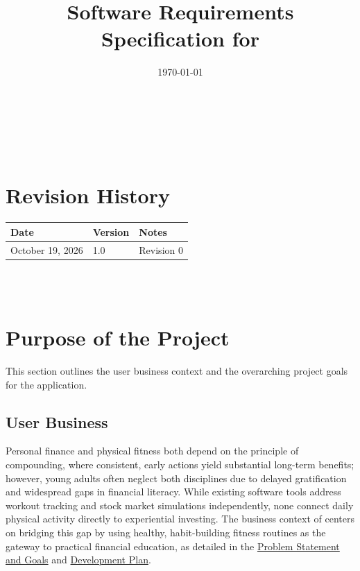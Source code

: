 \documentclass[12pt]{article}
\begin{document}
\title{Software Requirements Specification for \progname} 
\author{\authname}
\date{\today}
	
\maketitle

~\newpage


\tableofcontents

~\newpage

\section*{Revision History}

\begin{tabularx}{\textwidth}{p{3cm}p{2cm}X}
\toprule {\textbf{Date}} & {\textbf{Version}} & {\textbf{Notes}}\\
\midrule
October 19, 2026 & 1.0 & Revision 0\\
\bottomrule
\end{tabularx}

~\\

~\newpage
\section{Purpose of the Project}
This section outlines the user business context and the overarching project
goals for the \progname{} application.

\subsection{User Business}
Personal finance and physical fitness both depend on the principle of
compounding, where consistent, early actions yield substantial long-term
benefits; however, young adults often neglect both disciplines due to delayed
gratification and widespread gaps in financial literacy. While existing software
tools address workout tracking and stock market simulations independently, none
connect daily physical activity directly to experiential investing. The business
context of \progname{} centers on bridging this gap by using healthy,
habit-building fitness routines as the gateway to practical financial education,
as detailed in the
\href{https://github.com/arjunkarthik123/fitness-finance-application/blob/main/pdfs/ProblemStatementAndGoals/ProblemStatement.pdf}{Problem Statement and Goals}
and \href{https://github.com/arjunkarthik123/fitness-finance-application/blob/main/pdfs/DevelopmentPlan/DevelopmentPlan.pdf}{Development Plan}.
\end{document}
